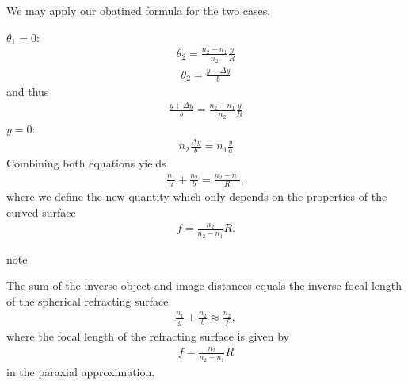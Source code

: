 \documentclass[letterpaper,10pt,english]{sphinxmanual}
\begin{document}
We may apply our obatined formula for the two cases.

\(\theta_1=0\):
\begin{equation*}
\begin{split}\theta_2=\frac{n_2-n_1}{n_2}\frac{y}{R}\end{split}
\end{equation*}\begin{equation*}
\begin{split}\theta_2=\frac{y+\Delta y}{b}\end{split}
\end{equation*}
and thus
\begin{equation*}
\begin{split}\frac{y+\Delta y}{b}=\frac{n_2-n_1}{n_2}\frac{y}{R}\end{split}
\end{equation*}
\(y=0\):
\begin{equation*}
\begin{split}n_2\frac{\Delta y}{b}=n_1\frac{y}{a}\end{split}
\end{equation*}
Combining both equations yields
\begin{equation*}
\begin{split}\frac{n_1}{a}+\frac{n_2}{b}=\frac{n_2-n_1}{ R},\end{split}
\end{equation*}
where we define the new quantity  which only depends on the properties of the curved surface
\begin{equation*}
\begin{split}f=\frac{n_2}{n_2-n_1}R.\end{split}
\end{equation*}
\begin{sphinxadmonition}{note}{}\unskip
{}

The sum of the inverse object and image distances equals the inverse focal length of the spherical refracting surface
\begin{equation*}
\begin{split}\frac{n_1}{g}+\frac{n_2}{b}\approx\frac{n_2}{f},\end{split}
\end{equation*}
where the focal length of the refracting surface is given by
\begin{equation*}
\begin{split}f=\frac{n_2}{n_2-n_1}R\end{split}
\end{equation*}
in the paraxial approximation.
\end{sphinxadmonition}
\end{document}

